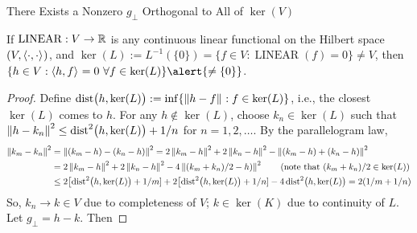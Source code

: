 \documentclass[10pt,compress,xcolor={usenames,dvipsnames},aspectratio=169]{beamer}
\DeclareMathOperator{\LIN}{LINEAR}
\begin{document}
\begin{frame}[label = lemma]{There Exists a Nonzero $g_\perp$ Orthogonal to All of $\ker(V)$ \hyperlink{generalRiesz}{}}
\begin{lemma}
     If $\LIN: V \to \reals$ is any \alert{continuous} linear functional on the Hilbert space $(V,\left \langle \cdot, \cdot \right \rangle_{{}})$, and $\ker(L) := L^{-1}(\{0\}) = \{f \in V : \LIN(f) = 0\} \ne V$,
 	then $ \{ h \in V : \ip{h}{f} = 0 \ \forall f \in \ker(L)\} \alert{\ne \{0\}}$.
\end{lemma}
\begin{proof}
Define $\operatorname{dist}\bigl(h,\ker(L)\bigr) := \inf\{ \left \lVert h - f \right \rVert_{{}} : f \in \ker(L)\}$, i.e., the closest $\ker(L)$ comes to $h$.  For any $h \notin \ker(L)$, choose $k_n \in \ker(L)$ such that $\left \lVert h - k_n \right \rVert_{{}}^2 \le \operatorname{dist}^2\bigl(h,\ker(L)\bigr) + 1/n$ for $n = 1, 2, \ldots$.  By the \alert{parallelogram law}, 
\begin{align*}
	\left \lVert k_m - k_n \right \rVert_{{}}^2 &= \left \lVert (k_m - h) - (k_n-h)  \right \rVert_{{}}^2 = 2\left \lVert k_m - h \right \rVert_{{}}^2 + 2\left \lVert k_n-h \right \rVert_{{}}^2 - \left \lVert (k_m - h) + (k_n-h)  \right \rVert_{{}}^2 \\
	&= 2\left \lVert k_m - h \right \rVert_{{}}^2 + 2\left \lVert k_n-h \right \rVert_{{}}^2 - 4\left \lVert (k_m+k_n)/2-h)  \right \rVert_{{}}^2 \qquad \text{(note that $(k_m+k_n)/2 \in \ker(L)$)}\\
	& \le 2\bigl[\operatorname{dist}^2\bigl(h,\ker(L)\bigr) + 1/m] + 2\bigl[\operatorname{dist}^2\bigl(h,\ker(L)\bigr) + 1/n] - 4\operatorname{dist}^2\bigl(h,\ker(L)\bigr) = 2(1/m+1/n)
\end{align*}
So, $k_n \to k \in V$ due to completeness of $V$; $k \in \ker(K)$ due to continuity of $L$. Let $g_\perp = h - k$.  Then 
\end{proof}
\end{frame}
\end{document}
